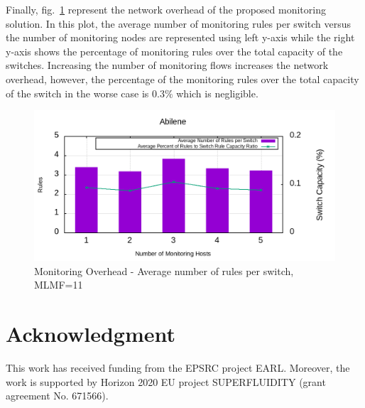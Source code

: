 \documentclass[10pt, journal, letterpaper]{IEEEtran}
\begin{document}
Finally, fig.~\ref{fig:eval_barchart_Average_Percent_of_Rules_to_Switch_Rule_Capacity_Ratio_max_len_of_route_11} represent the network overhead of the proposed monitoring solution. In this plot, the average number of monitoring rules per switch versus the number of monitoring nodes are represented using left y-axis while the right y-axis shows the percentage of monitoring rules over the total capacity of the switches. Increasing the number of monitoring flows increases the network overhead, however, the percentage of the monitoring rules over the total capacity of the switch in the worse case is $0.3\%$ which is negligible.
\begin{figure}
    \centering
    \includegraphics[width=\columnwidth]{img/eval_Abilene_barchart_Average_Percent_of_Rules_to_Switch_Rule_Capacity_Ratio_max_len_of_route_11.png}
    \caption{Monitoring Overhead - Average number of rules per switch, MLMF=11}
    \label{fig:eval_barchart_Average_Percent_of_Rules_to_Switch_Rule_Capacity_Ratio_max_len_of_route_11}
\end{figure}

\section*{Acknowledgment}
This work has received funding from the EPSRC project EARL. Moreover, the work is supported by Horizon 2020 EU project SUPERFLUIDITY (grant agreement No. 671566).
\end{document}
